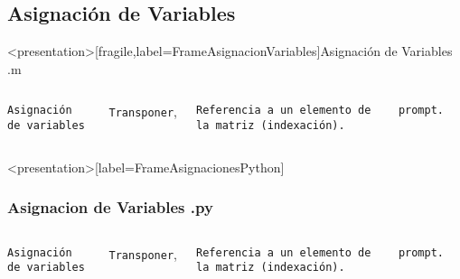 
\subsection{Asignación de Variables}

\mode*
\begin{frame}<presentation>[fragile,label=FrameAsignacionVariables]{Asignación de Variables .m}

\begin{columns}[T]

 \vspace{0.5cm}

\hfill \texttt{Asignación de variables}

\vspace{1cm}

\hfill \texttt{Transponer},

\vspace{2cm}

  \hfill \texttt{Referencia a un elemento de la matriz (indexación).}

\vspace{0.8cm}

\hfill \texttt{prompt.}

\begin{codeblock}
  
\end{codeblock}

\end{columns}
\end{frame}

\begin{frame}<presentation>[label=FrameAsignacionesPython]
  \frametitle{Asignacion de Variables .py}
\begin{columns}[T]

 \vspace{0.5cm}

\flushright \texttt{Asignación de variables}

\vspace{1cm}

\hfill \texttt{Transponer},

\vspace{2cm}

  \hfill \texttt{Referencia a un elemento de la matriz (indexación).}

\vspace{0.8cm}

\hfill \texttt{prompt.}

\begin{codeblock}
  
\end{codeblock}

\end{columns}

\end{frame}

